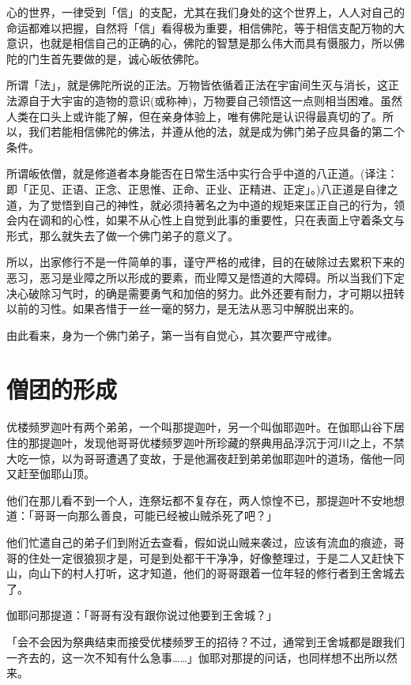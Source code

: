 \documentclass[12pt,twoside,openany]{book}
\begin{document}
心的世界，一律受到「信」的支配，尤其在我们身处的这个世界上，人人对自己的命运都难以把握，自然将「信」看得极为重要，相信佛陀，等于相信支配万物的大意识，也就是相信自己的正确的心，佛陀的智慧是那么伟大而具有慑服力，所以佛陀的门生首先要做的是，诚心皈依佛陀。

所谓「法」，就是佛陀所说的正法。万物皆依循着正法在宇宙间生灭与消长，这正法源自于大宇宙的造物的意识(或称神)，万物要自己领悟这一点则相当困难。虽然人类在口头上或许能了解，但在亲身体验上，唯有佛陀是认识得最真切的了。所以，我们若能相信佛陀的佛法，并遵从他的法，就是成为佛门弟子应具备的第二个条件。

所谓皈依僧，就是修道者本身能否在日常生活中实行合乎中道的八正道。(译注：即「正见、正语、正念、正思惟、正命、正业、正精进、正定」。)八正道是自律之道，为了觉悟到自己的神性，就必须持著名之为中道的规矩来匡正自己的行为，领会内在调和的心性，如果不从心性上自觉到此事的重要性，只在表面上守着条文与形式，那么就失去了做一个佛门弟子的意义了。

所以，出家修行不是一件简单的事，谨守严格的戒律，目的在破除过去累积下来的恶习，恶习是业障之所以形成的要素，而业障又是悟道的大障碍。所以当我们下定决心破除习气时，的确是需要勇气和加倍的努力。此外还要有耐力，才可期以扭转以前的习性。如果吝惜于一丝一毫的努力，是无法从恶习中解脱出来的。

由此看来，身为一个佛门弟子，第一当有自觉心，其次要严守戒律。

\section{僧团的形成}\label{sec3.7}

优楼频罗迦叶有两个弟弟，一个叫那提迦叶，另一个叫伽耶迦叶。在伽耶山谷下居住的那提迦叶，发现他哥哥优楼频罗迦叶所珍藏的祭典用品浮沉于河川之上，不禁大吃一惊，以为哥哥遭遇了变故，于是他漏夜赶到弟弟伽耶迦叶的道场，偕他一同又赶至伽耶山顶。

他们在那儿看不到一个人，连祭坛都不复存在，两人惊惶不已，那提迦叶不安地想道：「哥哥一向那么善良，可能已经被山贼杀死了吧？」

他们忙遣自己的弟子们到附近去查看，假如说山贼来袭过，应该有流血的痕迹，哥哥的住处一定很狼狈才是，可是到处都干干净净，好像整理过，于是二人又赶快下山，向山下的村人打听，这才知道，他们的哥哥跟着一位年轻的修行者到王舍城去了。

伽耶问那提道：「哥哥有没有跟你说过他要到王舍城？」

「会不会因为祭典结束而接受优楼频罗王的招待？不过，通常到王舍城都是跟我们一齐去的，这一次不知有什么急事……」伽耶对那提的问话，也同样想不出所以然来。
\end{document}
